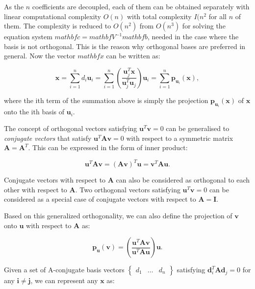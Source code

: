 \documentclass[10pt,b5paper,titlepage]{book}
\begin{document}
As the $n$ coefficients are decoupled, each of them can be obtained separately
with linear computational complexity $O(n)$ with total complexity  $I(n^{2}$
for all $n$ of them. The complexity is reduced to $O(n^{2})$ from $O(n^{3})$
for solving the equation system $mathbf{c} = mathbf{V}^{-1}mathbf{b}$, needed in the case
where the basis is not orthogonal. This is the reason why orthogonal bases are
preferred in general. Now the vector $mathbf{x}$ can be written as:

\begin{equation}
    \mathbf{x} = \sum_{i=1}^{n} d_{i} \mathbf{u}_{i}
    = \sum_{i=1}^{n} \left(
    \frac{\mathbf{u}_{j}^{T}\mathbf{x}}{\mathbf{u}_{j}^{T}\mathbf{u}_{j}}
    \right) \mathbf{u}_{i}
    = \sum_{i=1}^{n} \mathbf{p}_{\mathbf{u}_{i}}(\mathbf{x})
,\end{equation}

where the ith term of the summation above is simply the projection
$\mathbf{p}_{\mathbf{u}_{i}}(\mathbf{x})$ of $\mathbf{x}$ onto the ith basis of $\mathbf{u}_{i}$.

The concept of orthogonal vectors satisfying $\mathbf{u}^{T}\mathbf{v} = 0$
can be generalised to \textit{conjugate vectors} that satisfy
$\mathbf{u}^{T}\mathbf{A}\mathbf{v} = 0$ with respect to a symmetric matrix
$\mathbf{A} = \mathbf{A}^{T}$. This can be expressed in the form of inner product:

\begin{equation}
    \mathbf{u}^{T} \mathbf{A} \mathbf{v}
    = (\mathbf{A}\mathbf{v})^{T}\mathbf{u}
    = \mathbf{v}^{T}\mathbf{A}\mathbf{u}
.\end{equation}

Conjugate vectors with respect to $\mathbf{A}$ can also be considered as orthogonal
to each other with respect to $\mathbf{A}$. Two orthogonal vectors satisfying
$\mathbf{u}^{T}\mathbf{v} = 0$ can be considered as a special case of conjugate
vectors with respect to $\mathbf{A} = \mathbf{I}$.

Based on this generalized orthogonality, we can also define the projection of
$\mathbf{v}$ onto $\mathbf{u}$ with respect to $\mathbf{A}$ as:

\begin{equation}
    \mathbf{p}_{\mathbf{u}}(\mathbf{v}) = \left(
    \frac{\mathbf{u}^{T}\mathbf{A}\mathbf{v}}{\mathbf{u}^{T}\mathbf{A}\mathbf{u}}
    \right) \mathbf{u}
.\end{equation}

Given a set of A-conjugate basis vectors $\begin{Bmatrix} d_1 & \ldots & d_n \end{Bmatrix}$
satisfying $\mathbf{d}_{i}^{T}\mathbf{A}\mathbf{d}_{j} = 0$ for any $\mathbf{i \neq j}$,
we can represent any $\mathbf{x}$ as:
\end{document}
